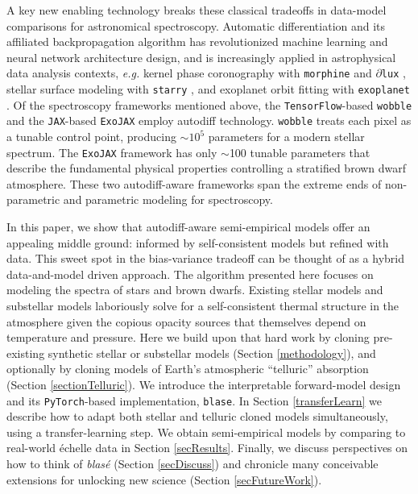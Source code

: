 \documentclass[twocolumn]{aastex631}
\begin{document}
A key new enabling technology breaks these classical tradeoffs in data-model comparisons for astronomical spectroscopy.  Automatic differentiation \citep[``autodiff'' or ``autograd'',][]{2015arXiv150205767G, 2016PhDT.......317M} and its affiliated backpropagation algorithm \citep{kelley1960,Linnainmaa1976TaylorEO, 1986Natur.323..533R, 1990JGCD...13..926D} has revolutionized machine learning and neural network architecture design, and is increasingly applied in astrophysical data analysis contexts, \emph{e.g.} kernel phase coronography with \texttt{morphine} \citep{2021ApJ...907...40P,2021JOSAB..38.2465W} and $\partial$\texttt{lux} \citep{10.1117/12.2629774}, stellar surface modeling with \texttt{starry} \citep{2021AJ....162..123L}, and exoplanet orbit fitting with \texttt{exoplanet} \citep{2021JOSS....6.3285F}.  Of the spectroscopy frameworks mentioned above, the \texttt{TensorFlow}-based \citep{tensorflow2015-whitepaper} \texttt{wobble} and the \texttt{JAX}-based \citep{jax2018github} \texttt{ExoJAX} employ autodiff technology.  \texttt{wobble} treats each pixel as a tunable control point, producing $\sim10^5$ parameters for a modern stellar spectrum.  The \texttt{ExoJAX} framework has only $\sim$100 tunable parameters that describe the fundamental physical properties controlling a stratified brown dwarf atmosphere.  These two autodiff-aware frameworks span the extreme ends of non-parametric and parametric modeling for spectroscopy.

In this paper, we show that autodiff-aware semi-empirical models offer an appealing middle ground: informed by self-consistent models but refined with data.  This sweet spot in the bias-variance tradeoff can be thought of as a hybrid data-and-model driven approach.  The algorithm presented here focuses on modeling the spectra of stars and brown dwarfs.  Existing stellar models \citep[\emph{e.g.}][]{husser13} and substellar models \citep[\emph{e.g.}][]{2021ApJ...920...85M} laboriously solve for a self-consistent thermal structure in the atmosphere given the copious opacity sources that themselves depend on temperature and pressure.  Here we build upon that hard work by cloning pre-existing synthetic stellar or substellar models (Section \ref{methodology}), and optionally by cloning models of Earth's atmospheric ``telluric'' absorption (Section \ref{sectionTelluric}). We introduce the interpretable forward-model design and its \texttt{PyTorch}-based \citep{2019arXiv191201703P} implementation, \texttt{blase}.  In Section \ref{transferLearn}  we describe how to adapt both stellar and telluric cloned models simultaneously, using a transfer-learning step.  We obtain semi-empirical models by comparing to real-world \'echelle data in Section \ref{secResults}. Finally, we discuss perspectives on how to think of \emph{blas\'e} (Section \ref{secDiscuss}) and chronicle many conceivable extensions for unlocking new science (Section \ref{secFutureWork}).
\end{document}
